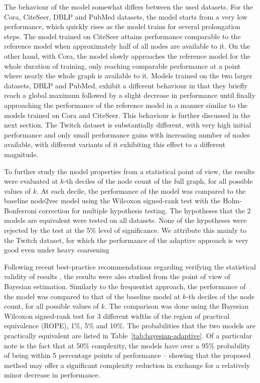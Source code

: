 The behaviour of the model somewhat differs between the used datasets. For the Cora, CiteSeer, DBLP and PubMed datasets, the model starts from a very low performance, which quickly rises as the model trains for several prolongation steps. The model trained on CiteSeer attains performance comparable to the reference model when approximately half of all nodes are available to it. On the other hand, with Cora, the model slowly approaches the reference model for the whole duration of training, only reaching comparable performance at a point where nearly the whole graph is available to it. Models trained on the two larger datasets, DBLP and PubMed, exhibit a different behaviour in that they briefly reach a global maximum followed by a slight decrease in performance until finally approaching the performance of the reference model in a manner similar to the models trained on Cora and CiteSeer. This behaviour is further discussed in the next section. The Twitch dataset is substantially different, with very high initial performance and only small performance gains with increasing number of nodes available, with different variants of it exhibiting this effect to a different magnitude.

To further study the model properties from a statistical point of view, the results were evaluated at \( k \)-th deciles of the node count of the full graph, for all possible values of \( k \). At each decile, the performance of the model was compared to the baseline node2vec model using the Wilcoxon signed-rank test with the Holm-Bonferroni correction for multiple hypothesis testing. The hypotheses that the 2 models are equivalent were tested on all datasets. None of the hypotheses were rejected by the test at the 5\% level of significance. We attribute this mainly to the Twitch dataset, for which the performance of the adaptive approach is very good even under heavy coarsening

Following recent best-practice recommendations regarding verifying the statistical validity of results \cite{benavoli_time_2017}, the results were also studied from the point of view of Bayesian estimation. Similarly to the frequentist approach, the performance of the model was compared to that of the baseline model at \( k \)-th deciles of the node count, for all possible values of \( k \). The comparison was done using the Bayesian Wilcoxon signed-rank test \cite{benavoli_bayesian_2014} for 3 different widths of the region of practical equivalence (ROPE), 1\%, 5\% and 10\%. The probabilities that the two models are practically equivalent are listed in Table~\ref{tab:bayesian-adaptive}. Of a particular note is the fact that at 50\% complexity, the models have over a 95\% probability of being within 5 percentage points of performance -- showing that the proposed method may offer a significant complexity reduction in exchange for a relatively minor decrease in performance.

